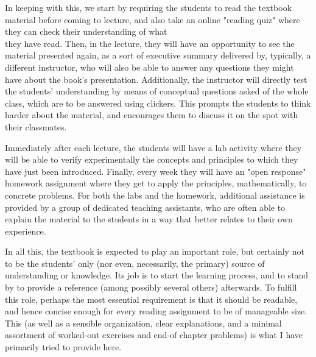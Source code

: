 \documentclass[10pt]{article}
\begin{document}
In keeping with this, we start by requiring the students to read the textbook material before coming to lecture, and also take an online "reading quiz" where they can check their understanding of what\\
they have read. Then, in the lecture, they will have an opportunity to see the material presented again, as a sort of executive summary delivered by, typically, a different instructor, who will also be able to answer any questions they might have about the book's presentation. Additionally, the instructor will directly test the students' understanding by means of conceptual questions asked of the whole class, which are to be answered using clickers. This prompts the students to think harder about the material, and encourages them to discuss it on the spot with their classmates.

Immediately after each lecture, the students will have a lab activity where they will be able to verify experimentally the concepts and principles to which they have just been introduced. Finally, every week they will have an "open response" homework assignment where they get to apply the principles, mathematically, to concrete problems. For both the labs and the homework, additional assistance is provided by a group of dedicated teaching assistants, who are often able to explain the material to the students in a way that better relates to their own experience.

In all this, the textbook is expected to play an important role, but certainly not to be the students' only (nor even, necessarily, the primary) source of understanding or knowledge. Its job is to start the learning process, and to stand by to provide a reference (among possibly several others) afterwards. To fulfill this role, perhaps the most essential requirement is that it should be readable, and hence concise enough for every reading assignment to be of manageable size. This (as well as a sensible organization, clear explanations, and a minimal assortment of worked-out exercises and end-of chapter problems) is what I have primarily tried to provide here.
\end{document}
